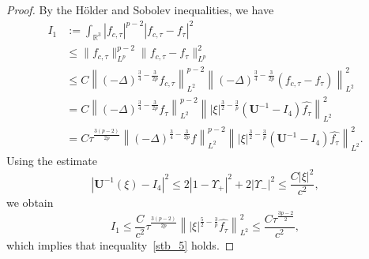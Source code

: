 \documentclass{amsart}
\theoremstyle{plain}
\theoremstyle{definition}
\theoremstyle{remark}
\numberwithin{equation}{section} \numberwithin{figure}{section}
\begin{document}
      \begin{proof}
      By the Hölder and Sobolev inequalities, we have
      \begin{equation*}
      \begin{aligned}
      I_1 &:= \int_{\mathbb{R}^3} |f_{c,\tau}|^{p-2} \left| f_{c,\tau} - f_\tau \right|^2 \\
      &\leq \|f_{c, \tau}\|_{L^p}^{p-2} \|f_{c,\tau} - f_\tau\|_{L^p}^2 \\
      &\leq C \left\|(-\Delta)^{\frac{3}{4} - \frac{3}{2p}} f_{c,\tau}\right\|_{L^2}^{p-2} \left\|(-\Delta)^{\frac{3}{4} - \frac{3}{2p}} (f_{c,\tau} - f_\tau)\right\|_{L^2}^2 \\
      &= C \left\|(-\Delta)^{\frac{3}{4} - \frac{3}{2p}} f_{\tau}\right\|_{L^2}^{p-2} \left\||\xi|^{\frac{3}{2} - \frac{3}{p}} (\mathbf{U}^{-1} - I_4) \widehat{f_\tau} \right\|_{L^2}^2 \\
      &= C \tau^{\frac{3(p-2)}{2p}} \left\|(-\Delta)^{\frac{3}{4} - \frac{3}{2p}} f\right\|_{L^2}^{p-2} \left\||\xi|^{\frac{3}{2} - \frac{3}{p}} (\mathbf{U}^{-1} - I_4) \widehat{f_\tau} \right\|_{L^2}^2.
      \end{aligned}
      \end{equation*}
      Using the estimate
      \[
      |\mathbf{U}^{-1}(\xi) - I_4|^2 \leq 2|1 - \Upsilon_+|^2 + 2|\Upsilon_-|^2 \leq \frac{C|\xi|^2}{c^2},
      \]
      we obtain
      \[
      I_1 \leq \frac{C}{c^2} \tau^{\frac{3(p-2)}{2p}} \left\||\xi|^{\frac{5}{2} - \frac{3}{p}} \widehat{f_\tau} \right\|_{L^2}^2 \leq \frac{C \tau^{\frac{3p-2}{2}}}{c^2},
      \]
      which implies that inequality~\eqref{stb_5} holds.
      

\end{proof}
\end{document}
